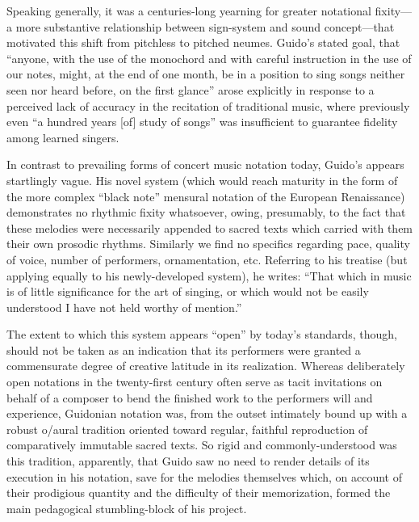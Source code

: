     Speaking generally, it was a centuries-long yearning for greater notational fixity---a more substantive relationship between sign-system and sound concept---that motivated this shift from pitchless to pitched neumes. Guido's stated goal, that ``anyone, with the use of the monochord and with careful instruction in the use of our notes, might, at the end of one month, be in a position to sing songs neither seen nor heard before, on the first glance''\autocite[16]{Arezzo_1943} arose explicitly in response to a perceived lack of accuracy in the recitation of traditional music, where previously even ``a hundred years [of] study of songs''\autocite[17]{Arezzo_1943} was insufficient to guarantee fidelity among learned singers.


    In contrast to prevailing forms of concert music notation today, Guido's appears startlingly vague. His novel system (which would reach maturity in the form of the more complex ``black note'' mensural notation of the European Renaissance) demonstrates no rhythmic fixity whatsoever, owing, presumably, to the fact that these melodies were necessarily appended to sacred texts which carried with them their own prosodic rhythms. Similarly we find no specifics regarding pace, quality of voice, number of performers, ornamentation, etc. Referring to his treatise (but applying equally to his newly-developed system), he writes: ``That which in music is of little significance for the art of singing, or which would not be easily understood I have not held worthy of mention.''



    The extent to which this system appears ``open'' by today's standards, though, should not be taken as an indication that its performers were granted a commensurate degree of creative latitude in its realization. Whereas deliberately open notations in the twenty-first century often serve as tacit invitations on behalf of a composer to bend the finished work to the performers will and experience, Guidonian notation was, from the outset intimately bound up with a robust o/aural tradition oriented toward regular, faithful reproduction of comparatively immutable sacred texts. So rigid and commonly-understood was this tradition, apparently, that Guido saw no need to render details of its execution in his notation, save for the melodies themselves which, on account of their prodigious quantity and the difficulty of their memorization, formed the main pedagogical stumbling-block of his project. 

